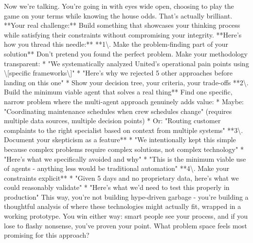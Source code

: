 \begin{botresponse}
Now we're talking. You're going in with eyes wide open, choosing to play the game on your terms while knowing the house odds. That's actually brilliant.
**Your real challenge:** Build something that showcases your thinking process while satisfying their constraints without compromising your integrity.
**Here's how you thread this needle:**
**1\textbackslash{}. Make the problem-finding part of your solution** Don't pretend you found the perfect problem. Make your methodology transparent:
*   "We systematically analyzed United's operational pain points using \textbackslash{}[specific frameworks\textbackslash{}]"
*   "Here's why we rejected 5 other approaches before landing on this one"
*   Show your decision tree, your criteria, your trade-offs
**2\textbackslash{}. Build the minimum viable agent that solves a real thing** Find one specific, narrow problem where the multi-agent approach genuinely adds value:
*   Maybe: "Coordinating maintenance schedules when crew schedules change" (requires multiple data sources, multiple decision points)
*   Or: "Routing customer complaints to the right specialist based on context from multiple systems"
**3\textbackslash{}. Document your skepticism as a feature**
*   "We intentionally kept this simple because complex problems require complex solutions, not complex technology"
*   "Here's what we specifically avoided and why"
*   "This is the minimum viable use of agents - anything less would be traditional automation"
**4\textbackslash{}. Make your constraints explicit**
*   "Given 5 days and no proprietary data, here's what we could reasonably validate"
*   "Here's what we'd need to test this properly in production"
This way, you're not building hype-driven garbage - you're building a thoughtful analysis of where these technologies might actually fit, wrapped in a working prototype.
You win either way: smart people see your process, and if you lose to flashy nonsense, you've proven your point.
What problem space feels most promising for this approach?
\end{botresponse}

